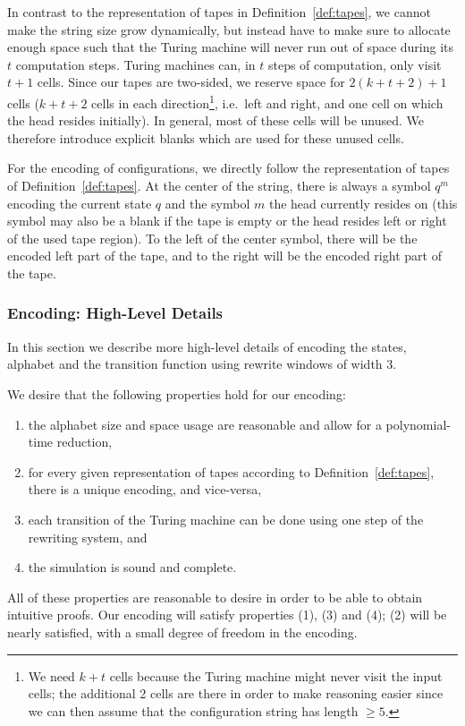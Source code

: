 \documentclass[a4paper,UKenglish,cleveref, autoref]{lipics-v2019}
\begin{document}
In contrast to the representation of tapes in Definition~\ref{def:tapes}, we cannot make the string size grow dynamically, but instead have to make sure to allocate enough space such that the Turing machine will never run out of space during its $t$ computation steps. Turing machines can, in $t$ steps of computation, only visit $t+1$ cells. Since our tapes are two-sided, we reserve space for $2(k + t + 2)+1$ cells ($k + t + 2$ cells in each direction\footnote{We need $k+t$ cells because the Turing machine might never visit the input cells; the additional 2 cells are there in order to make reasoning easier since we can then assume that the configuration string has length $\ge 5$.}, i.e.\ left and right, and one cell on which the head resides initially).
In general, most of these cells will be unused. We therefore introduce explicit blanks \blank{} which are used for these unused cells.

For the encoding of configurations, we directly follow the representation of tapes of Definition~\ref{def:tapes}.
At the center of the string, there is always a symbol $q^m$ encoding the current state $q$ and the symbol $m$ the head currently resides on (this symbol may also be a blank \blank{} if the tape is empty or the head resides left or right of the used tape region). 
To the left of the center symbol, there will be the encoded left part of the tape, and to the right will be the encoded right part of the tape. 

\newcommand{\polneg}[1]{\overleftarrow{#1}}
\newcommand{\polpos}[1]{\overrightarrow{#1}}
\newcommand{\polneut}[1]{\overline{#1}}
\subsubsection{Encoding: High-Level Details}\label{sec:rewrules}
In this section we describe more high-level details of encoding the states, alphabet and the transition function using rewrite windows of width 3. 

We desire that the following properties hold for our encoding:
\begin{enumerate}
  \item the alphabet size and space usage are reasonable and allow for a polynomial-time reduction,
  \item for every given representation of tapes according to Definition~\ref{def:tapes}, there is a unique encoding, and vice-versa,
  \item each transition of the Turing machine can be done using one step of the rewriting system, and
  \item the simulation is sound and complete.
\end{enumerate}
All of these properties are reasonable to desire in order to be able to obtain intuitive proofs.
Our encoding will satisfy properties (1), (3) and (4); (2) will be nearly satisfied, with a small degree of freedom in the encoding.
\end{document}
